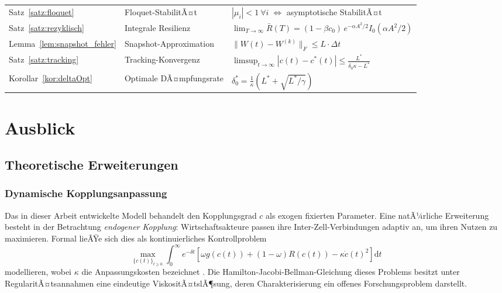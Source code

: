 ﻿\documentclass[a4paper,12pt]{article}
\theoremstyle{definition}
\begin{document}
\begin{table}[H]
\begin{tabular}{llp{7.0cm}}
Satz~\ref{satz:floquet}     & Floquet-StabilitÃ¤t        & $|\mu_i|<1\ \forall i\;\Leftrightarrow$ asymptotische StabilitÃ¤t \\
Satz~\ref{satz:rezyklisch}  & Integrale Resilienz       & $\lim_{T\to\infty}\bar{R}(T)=(1-\beta c_0)\,e^{-\alpha A^2/2}I_0(\alpha A^2/2)$ \\
Lemma~\ref{lem:snapshot_fehler} & Snapshot-Approximation & $\|W(t)-W^{(k)}\|_F\leq L\cdot\Delta t$ \\
Satz~\ref{satz:tracking}    & Tracking-Konvergenz       & $\limsup_{t\to\infty}|c(t)-c^*(t)|\leq\frac{L^*}{\delta_0\kappa-L^*}$ \\
Korollar~\ref{kor:deltaOpt} & Optimale DÃ¤mpfungsrate    & $\delta_0^*=\frac{1}{\kappa}(L^*+\sqrt{L^*/\gamma})$ \\
\bottomrule
\end{tabular}
\end{table}

\section{Ausblick}

\subsection{Theoretische Erweiterungen}

\subsubsection{Dynamische Kopplungsanpassung}

Das in dieser Arbeit entwickelte Modell behandelt den Kopplungsgrad $c$ als exogen fixierten
Parameter. Eine natÃ¼rliche Erweiterung besteht in der Betrachtung \emph{endogener Kopplung}:
Wirtschaftsakteure passen ihre Inter-Zell-Verbindungen adaptiv an, um ihren Nutzen zu maximieren.
Formal lieÃŸe sich dies als kontinuierliches Kontrollproblem
\[
    \max_{\{c(t)\}_{t\geq 0}} \int_0^\infty e^{-\delta t}
    \left[\omega g(c(t)) + (1-\omega) R(c(t)) - \kappa \dot{c}(t)^2\right] \mathrm{d}t
\]
modellieren, wobei $\kappa$ die Anpassungskosten bezeichnet \citep{caballero2009alchemy}.
Die Hamilton-Jacobi-Bellman-Gleichung dieses Problems besitzt unter RegularitÃ¤tsannahmen
eine eindeutige ViskositÃ¤tslÃ¶sung, deren Charakterisierung ein offenes Forschungsproblem darstellt.
\end{document}
